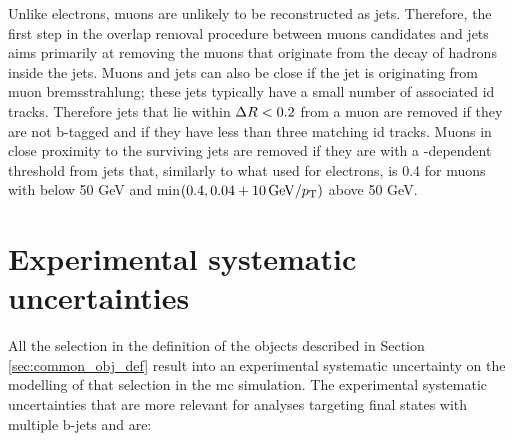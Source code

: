 Unlike electrons, muons are unlikely to be reconstructed as jets. Therefore, the first step in the overlap removal procedure between muons candidates and jets 
aims primarily at removing the muons that originate from the decay of hadrons inside the jets. 
Muons and jets can also be close if the jet is originating from muon bremsstrahlung; these jets typically have a small number of associated \gls{id} tracks.
Therefore jets that lie within $\Delta R < 0.2$ from a muon are removed if they are not b-tagged and if they have less than three matching \gls{id} tracks. 
Muons in close proximity to the surviving jets are removed if they are with a \pt-dependent threshold from jets that, similarly to what used for electrons, is 
0.4 for muons with \pt below 50 GeV and min$(0.4, 0.04 + 10 \, {\rm{GeV}}/p_{\rm T})$ above 50 GeV. 


\section{Experimental systematic uncertainties}
\label{sec:common_syst}

All the selection in the definition of the objects described in Section \ref{sec:common_obj_def} result into an experimental systematic uncertainty on the modelling of that selection in 
the \gls{mc} simulation. The experimental systematic uncertainties that are more relevant for analyses targeting final states with multiple b-jets and \met are:

